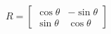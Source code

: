 \documentclass[preview]{standalone}
\begin{document}
\begin{align*}
R = \begin{bmatrix} \cos \theta & -\sin \theta \\ \sin \theta & \cos \theta \end{bmatrix}
\end{align*}
\end{document}
